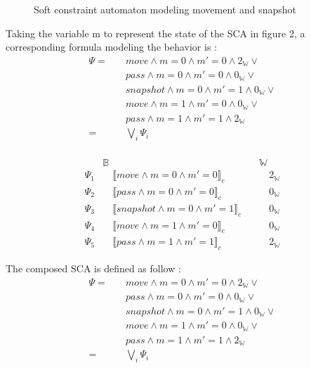 \begin{example}
\begin{figure}[H]
	\centering
	\resizebox{6cm}{!}{}
	\caption{Soft constraint automaton modeling movement and snapshot}\label{fig:myfigure}
\end{figure}
Taking the variable m to represent the state of the SCA in figure 2, a corresponding formula modeling the behavior is :
\begin{align*}
\Psi =  & \quad move \land m = 0 \land m'= 0 \land 2_\mathbb{W} \lor \\ 
& \quad pass \land m = 0 \land m'= 0 \land 0_\mathbb{W} \lor \\ 
& \quad snapshot \land m = 0 \land m'= 1 \land 0_\mathbb{W} \lor \\ 
& \quad move \land m = 1 \land m' = 0 \land 0_\mathbb{W} \lor \\ 
& \quad pass \land m = 1 \land m' = 1 \land 2_\mathbb{W} \\
 = & \quad \bigvee_i \Psi_i \\
\end{align*}
\end{example}
$$
\begin{array}{l|cr}
& \mathbb{B} & \mathbb{W}\\
\hline
\Psi_1 & \quad \llbracket move \land m = 0 \land m'= 0 \rrbracket_{c}  \quad & \quad 2_\mathbb{W} \\
\Psi_2 & \quad \llbracket pass \land m = 0 \land m'= 0 \rrbracket_{c} \quad & \quad 0_\mathbb{W} \\
\Psi_3 & \quad \llbracket snapshot \land m = 0 \land m'= 1 \rrbracket_{c} \quad & \quad 0_\mathbb{W} \\
\Psi_4 & \quad \llbracket move \land m = 1 \land m'= 0 \rrbracket_{c} \quad & \quad 0_\mathbb{W} \\
\Psi_5 & \quad \llbracket pass \land m = 1 \land m' = 1 \rrbracket_{c} \quad & \quad 2_\mathbb{W} 
\end{array} 
$$

The composed SCA is defined as follow :
\begin{align*}
\Psi =  & \quad move \land m = 0 \land m'= 0 \land 2_\mathbb{W} \lor \\ 
& \quad pass \land m = 0 \land m'= 0 \land 0_\mathbb{W} \lor \\ 
& \quad snapshot \land m = 0 \land m'= 1 \land 0_\mathbb{W} \lor \\ 
& \quad move \land m = 1 \land m' = 0 \land 0_\mathbb{W} \lor \\ 
& \quad pass \land m = 1 \land m' = 1 \land 2_\mathbb{W} \\
= & \quad \bigvee_i \Psi_i \\
\end{align*}
